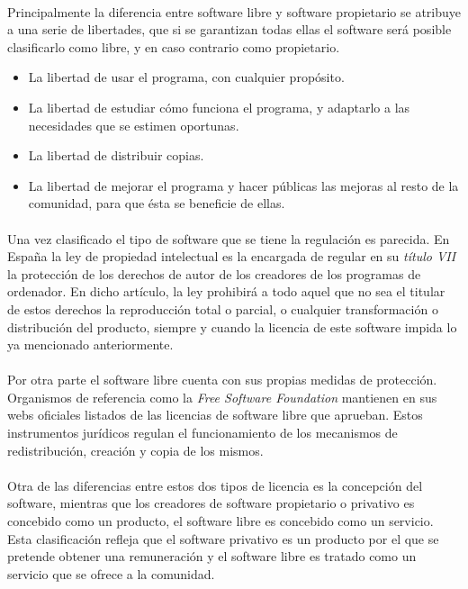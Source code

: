 \documentclass[10pt]{article}
\begin{document}
        \paragraph{}
        Principalmente la diferencia entre software libre y software propietario se atribuye a una serie de libertades, que si se garantizan todas ellas el software será posible clasificarlo como libre, y en caso contrario como propietario.
        \begin{itemize}
        \item La libertad de usar el programa, con cualquier propósito.
        \item La libertad de estudiar cómo funciona el programa, y adaptarlo a las necesidades que se estimen oportunas.
        \item La libertad de distribuir copias.
        \item La libertad de mejorar el programa y hacer públicas las mejoras al resto de la comunidad, para que ésta se beneficie de ellas.
        \end{itemize}
        \paragraph{}
        Una vez clasificado el tipo de software que se tiene la regulación es parecida. En España la ley de propiedad intelectual es la encargada de regular en su \textit{título VII}\cite{Ley:tit7} la protección de los derechos de autor de los creadores de los programas de ordenador. En dicho artículo, la ley prohibirá a todo aquel que no sea el titular de estos derechos la reproducción total o parcial, o cualquier transformación o distribución del producto, siempre y cuando la licencia de este software impida lo ya mencionado anteriormente.
        
        \paragraph{}
        Por otra parte el software libre cuenta con sus propias medidas de protección. Organismos de referencia como la \textit{Free Software Foundation} mantienen en sus webs oficiales listados de las licencias de software libre que aprueban. Estos instrumentos jurídicos regulan el funcionamiento de los mecanismos de redistribución, creación y copia de los mismos.
        
        \paragraph{}
        Otra de las diferencias entre estos dos tipos de licencia es la concepción del software, mientras que los creadores de  software propietario o privativo es concebido como un producto, el software libre es concebido como un servicio. Esta clasificación refleja que el software privativo es un producto por el que se pretende obtener una remuneración y el software libre es tratado como un servicio que se ofrece a la comunidad.
        
\end{document}
